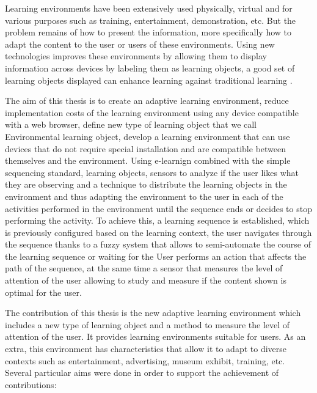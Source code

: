 Learning environments have been extensively used physically, virtual and for various purposes such as training, entertainment, demonstration, etc.
But the problem remains of how to present the information, more specifically how to adapt the content to the user or users of these environments.
Using new technologies improves these environments by allowing them to display information across devices by labeling them as learning objects, a good set of learning objects displayed can enhance learning against traditional learning \cite{Chen2007}.


The aim of this thesis is to create an adaptive learning environment, reduce implementation costs of the learning environment using any device compatible with a web browser,
define new type of learning object that we call Environmental learning object, develop a learning environment that can use devices that do not require special installation and are compatible between themselves and the environment. Using e-learnign combined with the simple sequencing standard, learning objects, sensors to analyze if the user likes what they are observing and a technique to distribute the learning objects in the environment and thus adapting the environment to the user in each of the activities performed in the environment until the sequence ends or decides to stop performing the activity. To achieve this, a learning sequence is established, which is previously configured based on the learning context, the user navigates through the sequence thanks to a fuzzy system that allows to semi-automate the course of the learning sequence or waiting for the User performs an action that affects the path of the sequence, at the same time a sensor that measures the level of attention of the user allowing to study and measure if the content shown is optimal for the user.

The contribution of this thesis is the new adaptive learning environment which includes a new type of learning object and a method to measure the level of attention of the user. It provides learning environments suitable for users. As an extra, this environment has characteristics that allow it to adapt to diverse contexts such as entertainment, advertising, museum exhibit, training, etc.
Several particular aims were done in order to support the achievement of contributions:

